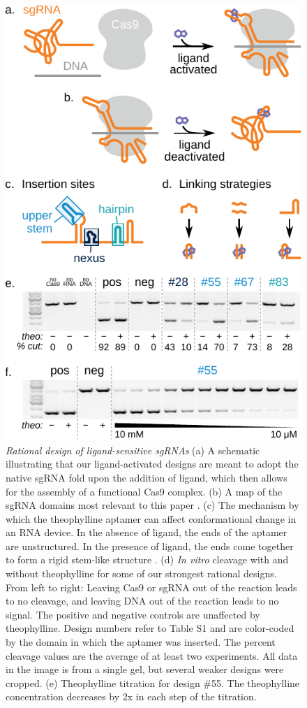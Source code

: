 \documentclass[twocolumn]{article}
\newcommand\captitle{\textit}
\begin{document}
\begin{figure}
 \includegraphics[width=\columnwidth]{figure_1}
 \caption{
  \captitle{Rational design of ligand-sensitive sgRNAs}
  (a) A schematic illustrating that our ligand-activated designs are meant to 
  adopt the native sgRNA fold upon the addition of ligand, which then allows 
  for the assembly of a functional Cas9 complex.
  (b) A map of the sgRNA domains most relevant to this paper 
  \autocite{briner2014}.
  (c) The mechanism by which the theophylline aptamer can affect conformational 
  change in an RNA device.  In the absence of ligand, the ends of the aptamer 
  are unstructured.  In the presence of ligand, the ends come together to form 
  a rigid stem-like structure \autocite{zimmerman1997}.
  (d) \emph{In vitro} cleavage with and without theophylline for some of our 
  strongest rational designs.  From left to right: Leaving Cas9 or sgRNA out of 
  the reaction leads to no cleavage, and leaving DNA out of the reaction leads 
  to no signal.  The positive and negative controls are unaffected by 
  theophylline.  Design numbers refer to Table S1 and are color-coded by the 
  domain in which the aptamer was inserted.  The percent cleavage values are 
  the average of at least two experiments.  All data in the image is from a 
  single gel, but several weaker designs were cropped.
  (e) Theophylline titration for design \#55.  The theophylline concentration 
  decreases by 2x in each step of the titration.
 }
 \label{fig1}
\end{figure}
\end{document}
